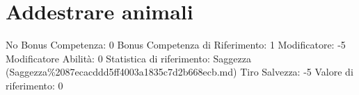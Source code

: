 \section{Addestrare animali}\label{addestrare-animali}

\begin{description}
\tightlist
\item[Tags: ABI]
No Bonus Competenza: 0 Bonus Competenza di Riferimento: 1 Modificatore:
-5 Modificatore Abilità: 0 Statistica di riferimento: Saggezza
(Saggezza\%2087ecacddd5ff4003a1835c7d2b668ecb.md) Tiro Salvezza: -5
Valore di riferimento: 0
\end{description}
